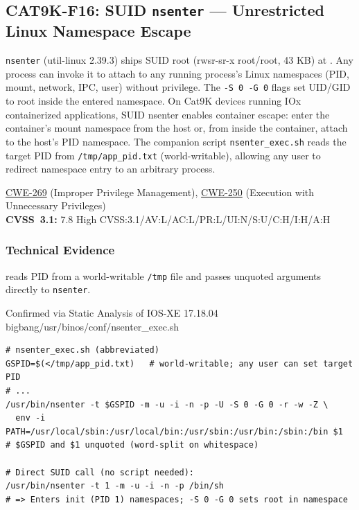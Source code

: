 \documentclass[11pt,a4paper]{article}
\begin{document}
\subsection{CAT9K-F16: SUID \texorpdfstring{\texttt{nsenter}}{nsenter} --- Unrestricted Linux Namespace Escape}

\begin{overviewbox}
\texttt{nsenter} (util-linux 2.39.3) ships SUID root (rwsr-sr-x root/root, 43 KB) at
. Any process can invoke it to attach to any running process's
Linux namespaces (PID, mount, network, IPC, user) without privilege. The
\texttt{-S~0~-G~0} flags set UID/GID to root inside the entered namespace. On Cat9K
devices running IOx containerized applications, SUID nsenter enables container escape:
enter the container's mount namespace from the host or, from inside the container,
attach to the host's PID namespace. The companion script \texttt{nsenter\_exec.sh}
reads the target PID from \texttt{/tmp/app\_pid.txt} (world-writable), allowing
any user to redirect namespace entry to an arbitrary process.

\href{https://cwe.mitre.org/data/definitions/269.html}{CWE-269} (Improper Privilege Management),
\href{https://cwe.mitre.org/data/definitions/250.html}{CWE-250} (Execution with Unnecessary Privileges)\\
\textbf{CVSS~3.1:} 7.8 High \quad CVSS:3.1/AV:L/AC:L/PR:L/UI:N/S:U/C:H/I:H/A:H
\end{overviewbox}

\subsubsection{Technical Evidence}

 reads PID from a world-writable \texttt{/tmp} file and passes
unquoted arguments directly to \texttt{nsenter}.

\begin{pocbox}{Confirmed via Static Analysis of IOS-XE 17.18.04 bigbang/usr/binos/conf/nsenter\_exec.sh}
\begin{lstlisting}[style=bash]
# nsenter_exec.sh (abbreviated)
GSPID=$(</tmp/app_pid.txt)   # world-writable; any user can set target PID
# ...
/usr/bin/nsenter -t $GSPID -m -u -i -n -p -U -S 0 -G 0 -r -w -Z \
  env -i PATH=/usr/local/sbin:/usr/local/bin:/usr/sbin:/usr/bin:/sbin:/bin $1
# $GSPID and $1 unquoted (word-split on whitespace)

# Direct SUID call (no script needed):
/usr/bin/nsenter -t 1 -m -u -i -n -p /bin/sh
# => Enters init (PID 1) namespaces; -S 0 -G 0 sets root in namespace
\end{lstlisting}
\end{pocbox}
\end{document}
